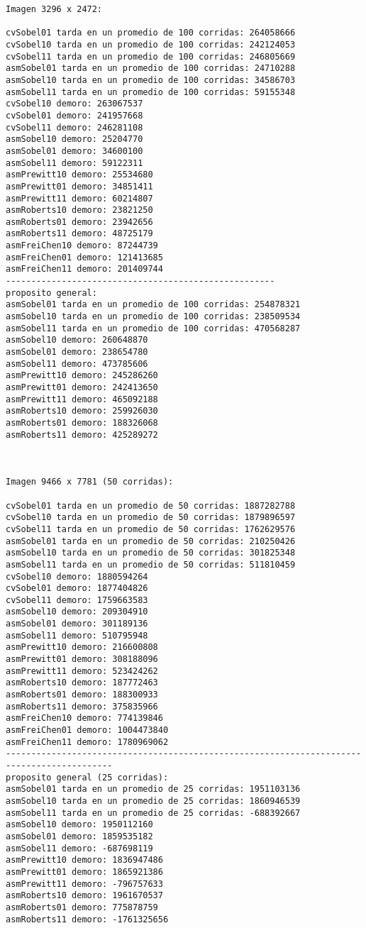 \documentclass[11pt]{article}
\begin{document}
\begin{lstlisting}[frame=single]
Imagen 3296 x 2472:

cvSobel01 tarda en un promedio de 100 corridas: 264058666
cvSobel10 tarda en un promedio de 100 corridas: 242124053
cvSobel11 tarda en un promedio de 100 corridas: 246805669
asmSobel01 tarda en un promedio de 100 corridas: 24710288
asmSobel10 tarda en un promedio de 100 corridas: 34586703
asmSobel11 tarda en un promedio de 100 corridas: 59155348
cvSobel10 demoro: 263067537
cvSobel01 demoro: 241957668
cvSobel11 demoro: 246281108
asmSobel10 demoro: 25204770
asmSobel01 demoro: 34600100
asmSobel11 demoro: 59122311
asmPrewitt10 demoro: 25534680
asmPrewitt01 demoro: 34851411
asmPrewitt11 demoro: 60214807
asmRoberts10 demoro: 23821250
asmRoberts01 demoro: 23942656
asmRoberts11 demoro: 48725179
asmFreiChen10 demoro: 87244739
asmFreiChen01 demoro: 121413685
asmFreiChen11 demoro: 201409744
-----------------------------------------------------
proposito general:
asmSobel01 tarda en un promedio de 100 corridas: 254878321
asmSobel10 tarda en un promedio de 100 corridas: 238509534
asmSobel11 tarda en un promedio de 100 corridas: 470568287
asmSobel10 demoro: 260648870
asmSobel01 demoro: 238654780
asmSobel11 demoro: 473785606
asmPrewitt10 demoro: 245286260
asmPrewitt01 demoro: 242413650
asmPrewitt11 demoro: 465092188
asmRoberts10 demoro: 259926030
asmRoberts01 demoro: 188326068
asmRoberts11 demoro: 425289272



Imagen 9466 x 7781 (50 corridas):

cvSobel01 tarda en un promedio de 50 corridas: 1887282788
cvSobel10 tarda en un promedio de 50 corridas: 1879896597
cvSobel11 tarda en un promedio de 50 corridas: 1762629576
asmSobel01 tarda en un promedio de 50 corridas: 210250426
asmSobel10 tarda en un promedio de 50 corridas: 301825348
asmSobel11 tarda en un promedio de 50 corridas: 511810459
cvSobel10 demoro: 1880594264
cvSobel01 demoro: 1877404826
cvSobel11 demoro: 1759663583
asmSobel10 demoro: 209304910
asmSobel01 demoro: 301189136
asmSobel11 demoro: 510795948
asmPrewitt10 demoro: 216600808
asmPrewitt01 demoro: 308188096
asmPrewitt11 demoro: 523424262
asmRoberts10 demoro: 187772463
asmRoberts01 demoro: 188300933
asmRoberts11 demoro: 375835966
asmFreiChen10 demoro: 774139846
asmFreiChen01 demoro: 1004473840
asmFreiChen11 demoro: 1780969062
-------------------------------------------------------------------------------------------
proposito general (25 corridas):
asmSobel01 tarda en un promedio de 25 corridas: 1951103136
asmSobel10 tarda en un promedio de 25 corridas: 1860946539
asmSobel11 tarda en un promedio de 25 corridas: -688392667
asmSobel10 demoro: 1950112160
asmSobel01 demoro: 1859535182
asmSobel11 demoro: -687698119
asmPrewitt10 demoro: 1836947486
asmPrewitt01 demoro: 1865921386
asmPrewitt11 demoro: -796757633
asmRoberts10 demoro: 1961670537
asmRoberts01 demoro: 775878759
asmRoberts11 demoro: -1761325656
\end{lstlisting}
\end{document}
